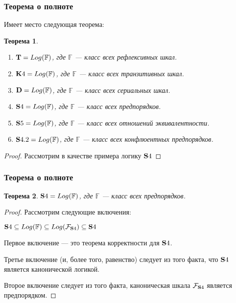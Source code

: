 \documentclass[pdf,utf8,russian,aspectratio=169]{beamer}
\newtheorem{theor}{Теорема}
\begin{document}
\begin{frame}
  \frametitle{Теорема о полноте}

  Имеет место следующая теорема:

\begin{theor}
  \begin{enumerate}
    \item ${\bf T} = Log(\mathbb{F})$, где $\mathbb{F}$ --- класс всех рефлексивных шкал.
    \item ${\bf K}4 = Log(\mathbb{F})$, где $\mathbb{F}$ --- класс всех транзитивных шкал.
    \item ${\bf D} = Log(\mathbb{F})$, где $\mathbb{F}$ --- класс всех сериальных шкал.
    \item ${\bf S}4 = Log(\mathbb{F})$, где $\mathbb{F}$ --- класс всех предпорядков.
    \item ${\bf S}5 = Log(\mathbb{F})$, где $\mathbb{F}$ --- класс всех отношений эквивалентности.
    \item ${\bf S}4.2 = Log(\mathbb{F})$, где $\mathbb{F}$ --- класс всех конфлюентных предпорядков.
  \end{enumerate}
\end{theor}

\begin{proof}
  Рассмотрим в качестве примера логику ${\bf S}4$
\end{proof}
\end{frame}

\begin{frame}
  \frametitle{Теорема о полноте}

\begin{theor}
    ${\bf S}4 = Log(\mathbb{F})$, где $\mathbb{F}$ --- класс всех предпорядков.
\end{theor}

\begin{proof}
    Рассмотрим следующие включения:

\begin{center}
    ${\bf S}4 \subseteq Log(\mathbb{F}) \subseteq Log(\mathcal{F}_{{\bf S}4}) \subseteq {\bf S}4$
\end{center}


Первое включение --- это теорема корректности для ${\bf S}4$.

Третье включение (и, более того, равенство) следует из того факта, что ${\bf S}4$ является канонической логикой.

Второе включение следует из того факта, каноническая шкала $\mathcal{F}_{{\bf S}4}$ является предпорядком.
\end{proof}


\end{frame}
\end{document}
